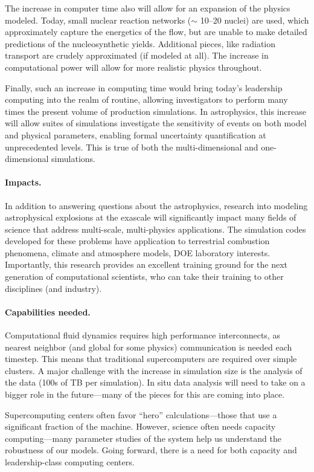 \documentclass[11pt,twocolumn]{article}
\begin{document}
The increase in computer time also will allow for an expansion of the
physics modeled.  Today, small nuclear reaction networks ($\sim$
10--20 nuclei) are used, which approximately capture the energetics of
the flow, but are unable to make detailed predictions of the
nucleosynthetic yields.  Additional pieces, like radiation transport
are crudely approximated (if modeled at all).  The increase in
computational power will allow for more realistic physics throughout.

Finally, such an increase in computing time would bring today's
leadership computing into the realm of routine, allowing investigators
to perform many times the present volume of production simulations.
In astrophysics, this increase will allow suites of simulations 
investigate the sensitivity of events on both model and physical
parameters, enabling formal uncertainty quantification at 
unprecedented levels.  This is true of both the multi-dimensional
and one-dimensional simulations.

\paragraph*{Impacts.} In addition to answering questions about the 
astrophysics, research into modeling astrophysical explosions at the
exascale will significantly impact many fields of science that address
multi-scale, multi-physics applications.  The simulation codes
developed for these problems have application to terrestrial combustion
phenomena, climate and atmosphere models, DOE laboratory interests.
Importantly, this research provides an excellent training ground for
the next generation of computational scientists, who can take their
training to other disciplines (and industry).


\paragraph*{Capabilities needed.}  Computational fluid dynamics requires 
high performance interconnects, as nearest neighbor (and global for
some physics) communication is needed each timestep.  This means that
traditional supercomputers are required over simple clusters.  A major
challenge with the increase in simulation size is the analysis of the
data (100s of TB per simulation).  In situ data analysis will need to
take on a bigger role in the future---many of the pieces for this are
coming into place.

Supercomputing centers often favor ``hero'' calculations---those that
use a significant fraction of the machine.
However, science often needs capacity computing---many parameter
studies of the system help us understand the robustness of our models.
Going forward, there is a need for both capacity and leadership-class
computing centers.
\end{document}
